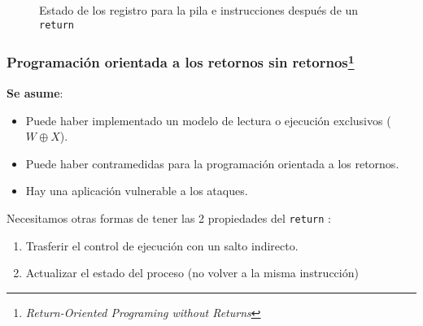 \documentclass{beamer}
\newcommand { \return } {\texttt{return} }
\begin{document}
\begin{frame}
{\begin{figure}[h]
            \caption{Estado de los registro para la pila e instrucciones después de un \return}
        \end{figure}
    }
\end{frame}

\begin{frame}
    \frametitle{Programación orientada a los retornos sin retornos\footnote{\textit{Return-Oriented Programing without Returns}}}
    \textbf{Se asume}:
    \begin{itemize}
        \item Puede haber implementado un modelo de lectura o ejecución exclusivos ($W \oplus X$).
        \item Puede haber contramedidas para la programación orientada a los retornos.
        \item Hay una aplicación vulnerable a los ataques.
    \end{itemize}

    Necesitamos otras formas de tener las 2 propiedades del \return:
    \begin{enumerate}
        \item Trasferir el control de ejecución con un salto indirecto.
        \item Actualizar el estado del proceso (no volver a la misma instrucción)
    \end{enumerate}
\end{frame}
\end{document}
